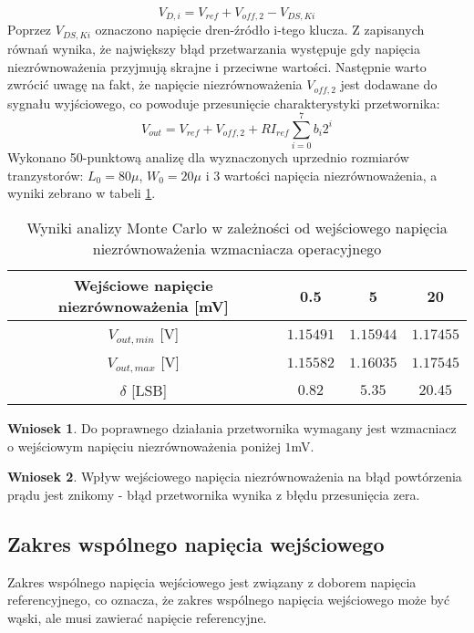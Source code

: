 \documentclass[10pt,a4paper,twoside]{report}
\theoremstyle{definition}
\theoremstyle{definition}
\theoremstyle{definition}
\theoremstyle{definition}
\theoremstyle{definition}
\newtheorem{wniosek}{Wniosek}[section]
\begin{document}
{{{{{{{		\begin{equation}
			V_{D,i} = V_{ref} + V_{off,2} - V_{DS,Ki}
		\end{equation}
	Poprzez $V_{DS,Ki}$ oznaczono napięcie dren-źródło i-tego klucza. Z zapisanych równań wynika, że największy błąd przetwarzania występuje gdy napięcia niezrównoważenia przyjmują skrajne i przeciwne wartości. Następnie warto zwrócić uwagę na fakt, że napięcie niezrównoważenia $V_{off,2}$ jest dodawane do sygnału wyjściowego, co powoduje przesunięcie charakterystyki przetwornika:
		\begin{equation}
		V_{out} = V_{ref} + V_{off,2} + R I_{ref} \sum_{i=0}^{7} b_i 2^i
		\end{equation}
	Wykonano 50-punktową analizę dla wyznaczonych uprzednio rozmiarów tranzystorów: $L_0 = 80\mu$, $W_0 = 20\mu$ i 3 wartości napięcia niezrównoważenia, a wyniki zebrano w tabeli \ref{tab:voff}. }
	\begin{table}[!ht]
	\begin{center}
		\begin{tabular}{|c|c|c|c|}
			\hline 
			Wejściowe napięcie niezrównoważenia [mV] & 0.5 & 5 & 20 \\ 
			\hline 
			$V_{out,min}$ [V] & $1.15491$ & $1.15944$ & $1.17455$ \\ 
			\hline
			$V_{out,max}$ [V] & $1.15582$ & $1.16035$ & $1.17545$ \\ 
			\hline 
			$\delta$ [LSB]  & $0.82 $ & $5.35$ & $20.45$ \\
			\hline
		\end{tabular}
	\end{center}
	\caption{Wyniki analizy Monte Carlo w zależności od wejściowego napięcia niezrównoważenia wzmacniacza operacyjnego}
	\label{tab:voff}
	\end{table}

	\begin{wniosek}{Do poprawnego działania przetwornika wymagany jest wzmacniacz o wejściowym napięciu niezrównoważenia poniżej $1$mV.}
	\end{wniosek}
	
	\begin{wniosek}{Wpływ wejściowego napięcia niezrównoważenia na błąd powtórzenia prądu jest znikomy - błąd przetwornika wynika z błędu przesunięcia zera.}
	\end{wniosek}


	\subsection{Zakres wspólnego napięcia wejściowego}
	{	Zakres wspólnego napięcia wejściowego jest związany z doborem napięcia referencyjnego, co oznacza, że zakres wspólnego napięcia wejściowego może być wąski, ale musi zawierać napięcie referencyjne. }
}}}}}}
\end{document}
